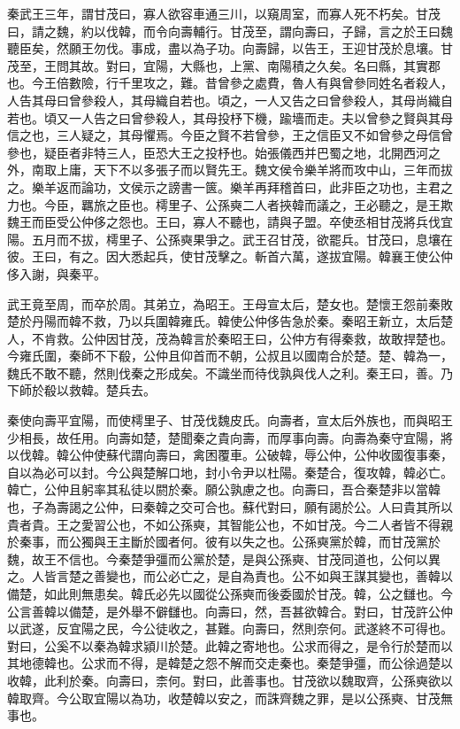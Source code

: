 秦武王三年，謂甘茂曰，寡人欲容車通三川，以窺周室，而寡人死不朽矣。甘茂曰，請之魏，約以伐韓，而令向壽輔行。甘茂至，謂向壽曰，子歸，言之於王曰魏聽臣矣，然願王勿伐。事成，盡以為子功。向壽歸，以告王，王迎甘茂於息壤。甘茂至，王問其故。對曰，宜陽，大縣也，上黨、南陽積之久矣。名曰縣，其實郡也。今王倍數險，行千里攻之，難。昔曾參之處費，魯人有與曾參同姓名者殺人，人告其母曰曾參殺人，其母織自若也。頃之，一人又告之曰曾參殺人，其母尚織自若也。頃又一人告之曰曾參殺人，其母投杼下機，踰墻而走。夫以曾參之賢與其母信之也，三人疑之，其母懼焉。今臣之賢不若曾參，王之信臣又不如曾參之母信曾參也，疑臣者非特三人，臣恐大王之投杼也。始張儀西并巴蜀之地，北開西河之外，南取上庸，天下不以多張子而以賢先王。魏文侯令樂羊將而攻中山，三年而拔之。樂羊返而論功，文侯示之謗書一篋。樂羊再拜稽首曰，此非臣之功也，主君之力也。今臣，羈旅之臣也。樗里子、公孫奭二人者挾韓而議之，王必聽之，是王欺魏王而臣受公仲侈之怨也。王曰，寡人不聽也，請與子盟。卒使丞相甘茂將兵伐宜陽。五月而不拔，樗里子、公孫奭果爭之。武王召甘茂，欲罷兵。甘茂曰，息壤在彼。王曰，有之。因大悉起兵，使甘茂擊之。斬首六萬，遂拔宜陽。韓襄王使公仲侈入謝，與秦平。

武王竟至周，而卒於周。其弟立，為昭王。王母宣太后，楚女也。楚懷王怨前秦敗楚於丹陽而韓不救，乃以兵圍韓雍氏。韓使公仲侈告急於秦。秦昭王新立，太后楚人，不肯救。公仲因甘茂，茂為韓言於秦昭王曰，公仲方有得秦救，故敢捍楚也。今雍氏圍，秦師不下殽，公仲且仰首而不朝，公叔且以國南合於楚。楚、韓為一，魏氏不敢不聽，然則伐秦之形成矣。不識坐而待伐孰與伐人之利。秦王曰，善。乃下師於殽以救韓。楚兵去。

秦使向壽平宜陽，而使樗里子、甘茂伐魏皮氏。向壽者，宣太后外族也，而與昭王少相長，故任用。向壽如楚，楚聞秦之貴向壽，而厚事向壽。向壽為秦守宜陽，將以伐韓。韓公仲使蘇代謂向壽曰，禽困覆車。公破韓，辱公仲，公仲收國復事秦，自以為必可以封。今公與楚解口地，封小令尹以杜陽。秦楚合，復攻韓，韓必亡。韓亡，公仲且躬率其私徒以閼於秦。願公孰慮之也。向壽曰，吾合秦楚非以當韓也，子為壽謁之公仲，曰秦韓之交可合也。蘇代對曰，願有謁於公。人曰貴其所以貴者貴。王之愛習公也，不如公孫奭，其智能公也，不如甘茂。今二人者皆不得親於秦事，而公獨與王主斷於國者何。彼有以失之也。公孫奭黨於韓，而甘茂黨於魏，故王不信也。今秦楚爭彊而公黨於楚，是與公孫奭、甘茂同道也，公何以異之。人皆言楚之善變也，而公必亡之，是自為責也。公不如與王謀其變也，善韓以備楚，如此則無患矣。韓氏必先以國從公孫奭而後委國於甘茂。韓，公之讎也。今公言善韓以備楚，是外舉不僻讎也。向壽曰，然，吾甚欲韓合。對曰，甘茂許公仲以武遂，反宜陽之民，今公徒收之，甚難。向壽曰，然則奈何。武遂終不可得也。對曰，公奚不以秦為韓求潁川於楚。此韓之寄地也。公求而得之，是令行於楚而以其地德韓也。公求而不得，是韓楚之怨不解而交走秦也。秦楚爭彊，而公徐過楚以收韓，此利於秦。向壽曰，柰何。對曰，此善事也。甘茂欲以魏取齊，公孫奭欲以韓取齊。今公取宜陽以為功，收楚韓以安之，而誅齊魏之罪，是以公孫奭、甘茂無事也。

